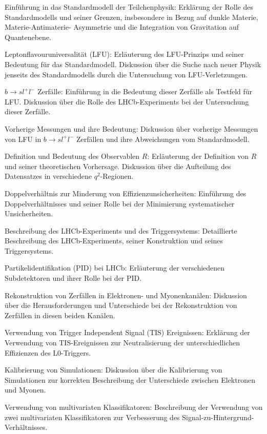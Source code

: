 Einführung in das Standardmodell der Teilchenphysik: 
Erklärung der Rolle des Standardmodells und seiner Grenzen, 
insbesondere in Bezug auf dunkle Materie, Materie-Antimaterie-
Asymmetrie und die Integration von Gravitation auf Quantenebene.

Leptonflavouruniversalität (LFU): 
Erläuterung des LFU-Prinzips und seiner Bedeutung für das 
Standardmodell. Diskussion über die Suche nach neuer Physik 
jenseits des Standardmodells durch die Untersuchung von 
LFU-Verletzungen.

$b\to sl^+l^-$ Zerfälle: 
Einführung in die Bedeutung dieser Zerfälle als Testfeld für LFU.
Diskussion über die Rolle des LHCb-Experiments bei der Untersuchung dieser Zerfälle.

Vorherige Messungen und ihre Bedeutung: 
Diskussion über vorherige Messungen von LFU in $b\to sl^+l^-$ Zerfällen 
und ihre Abweichungen vom Standardmodell.

Definition und Bedeutung des Observablen $R$: 
Erläuterung der Definition von $R$ und seiner theoretischen Vorhersage. 
Diskussion über die Aufteilung des Datensatzes in verschiedene 
$q^2$-Regionen.

Doppelverhältnis zur Minderung von Effizienzunsicherheiten: 
Einführung des Doppelverhältnisses und seiner Rolle bei der 
Minimierung systematischer Unsicherheiten.

Beschreibung des LHCb-Experiments und des Triggersystems: 
Detaillierte Beschreibung des LHCb-Experiments, seiner Konstruktion 
und seines Triggersystems.

Partikelidentifikation (PID) bei LHCb: 
Erläuterung der verschiedenen Subdetektoren und ihrer Rolle bei 
der PID.

Rekonstruktion von Zerfällen in Elektronen- und Myonenkanälen: 
Diskussion über die Herausforderungen und Unterschiede bei der
Rekonstruktion von Zerfällen in diesen beiden Kanälen.

Verwendung von Trigger Independent Signal (TIS) Ereignissen: 
Erklärung der Verwendung von TIS-Ereignissen zur Neutralisierung der 
unterschiedlichen Effizienzen des L0-Triggers.

Kalibrierung von Simulationen: 
Diskussion über die Kalibrierung von Simulationen zur korrekten 
Beschreibung der Unterschiede zwischen Elektronen und Myonen.

Verwendung von multivariaten Klassifikatoren: 
Beschreibung der Verwendung von zwei multivariaten Klassifikatoren zur 
Verbesserung des Signal-zu-Hintergrund-Verhältnisses.

